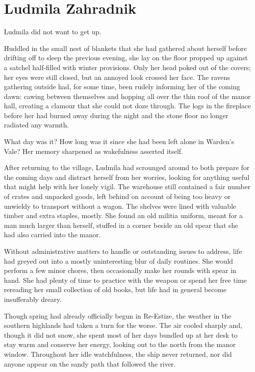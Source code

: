 \chapter{Ludmila Zahradnik}

Ludmila did not want to get up.

 

Huddled in the small nest of blankets that she had gathered about herself before drifting off to sleep the previous evening, she lay on the floor propped up against a satchel half-filled with winter provisions. Only her head poked out of the covers; her eyes were still closed, but an annoyed look crossed her face. The ravens gathering outside had, for some time, been rudely informing her of the coming dawn: cawing between themselves and hopping all over the thin roof of the manor hall, creating a clamour that she could not doze through. The logs in the fireplace before her had burned away during the night and the stone floor no longer radiated any warmth.

 

What day was it? How long was it since she had been left alone in Warden’s Vale? Her memory sharpened as wakefulness asserted itself.

 

After returning to the village, Ludmila had scrounged around to both prepare for the coming days and distract herself from her worries, looking for anything useful that might help with her lonely vigil. The warehouse still contained a fair number of crates and unpacked goods, left behind on account of being too heavy or unwieldy to transport without a wagon. The shelves were lined with valuable timber and extra staples, mostly. She found an old militia uniform, meant for a man much larger than herself, stuffed in a corner beside an old spear that she had also carried into the manor.

 

Without administrative matters to handle or outstanding issues to address, life had greyed out into a mostly uninteresting blur of daily routines. She would perform a few minor chores, then occasionally make her rounds with spear in hand. She had plenty of time to practice with the weapon or spend her free time rereading her small collection of old books, but life had in general become insufferably dreary.

 

Though spring had already officially begun in Re-Estize, the weather in the southern highlands had taken a turn for the worse. The air cooled sharply and, though it did not snow, she spent most of her days bundled up at her desk to stay warm and conserve her energy, looking out to the north from the manor window. Throughout her idle watchfulness, the ship never returned, nor did anyone appear on the sandy path that followed the river.

